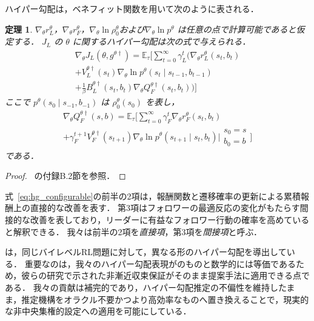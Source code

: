 \documentclass[originalpaper,fleqn]{jsaiart}     %
\providecommand{\E}{\mathbb{E}} %
\newtheorem{theorem}{定理}
\begin{document}
ハイパー勾配は，ベネフィット関数を用いて次のように表される．
\begin{theorem}
\label{thm:hg-configurable}
    $\nabla_{\theta} r_L^{\theta}$，$\nabla_{\theta} r_F^{\theta}$，$\nabla_{\theta} \ln \rho_0^{\theta}$および$\nabla_{\theta} \ln p^{\theta}$ は任意の点で計算可能であると仮定する．
    $J_L$ の $\theta$ に関するハイパー勾配は次の式で与えられる．
    \begin{multline}
        \nabla_{\theta}J_L({\theta}, g^{\theta\dagger})
        =\E_\tau\Bigg[\sum_{t=0}^\infty \gamma_L^t \bigg(\nabla_{\theta} r_L^{\theta}(s_t, b_t)\\
        + V_L^{{\theta}\dagger}(s_t) \nabla_{\theta}\ln
        p^{\theta} (s_{t} \mid s_{t-1}, b_{t-1})\\
        + \frac{1}{\beta} B_L^{{\theta}\dagger}(s_t, b_t) \nabla_{\theta} Q_F^{{\theta} \dagger}(s_t, b_t) \bigg) \Bigg]
    \label{eq:hg_configurable}
    \end{multline}
    ここで $p^{\theta}(s_0\mid s_{-1},b_{-1})$ は $\rho_0^{\theta}(s_0)$ を表し，
    \begin{multline}
        \nabla_{\theta}Q_F^{\theta\dag}(s,b) = \E_\tau\Bigg[\sum_{t=0}^\infty\gamma_F^t\nabla_{\theta}r_F^{\theta}(s_t,b_t)\\
        + \gamma_F^{t+1}V_F^{\theta\dag}(s_{t+1})\nabla_{\theta}\ln p^{\theta}(s_{t+1}\mid s_t,b_t) \Bigg|\begin{smallmatrix}s_0=s\\b_0=b\end{smallmatrix}\Bigg]\label{eq:nablaQF}
    \end{multline}
    である．
\end{theorem}
\begin{proof}
    ~\cite{kudo2026-arxiv}の付録B.2節を参照．
\end{proof}
式~\eqref{eq:hg_configurable}の前半の2項は，報酬関数と遷移確率の更新による累積報酬上の直接的な改善を表す．
第3項はフォロワーの最適反応の変化がもたらす間接的な改善を表しており，リーダーに有益なフォロワー行動の確率を高めていると解釈できる．
我々は前半の2項を\emph{直接項}，第3項を\emph{間接項}と呼ぶ．

\cite{Thoma2024-em}は，同じバイレベルRL問題に対して，異なる形のハイパー勾配を導出している．
重要なのは，我々のハイパー勾配表現が\cite{Thoma2024-em}のものと数学的には等価であるため，彼らの研究で示された非漸近収束保証がそのまま提案手法に適用できる点である．
我々の貢献は補完的であり，ハイパー勾配推定の不偏性を維持したまま，推定機構をオラクル不要かつより高効率なものへ置き換えることで，現実的な非中央集権的設定への適用を可能にしている．
\end{document}
